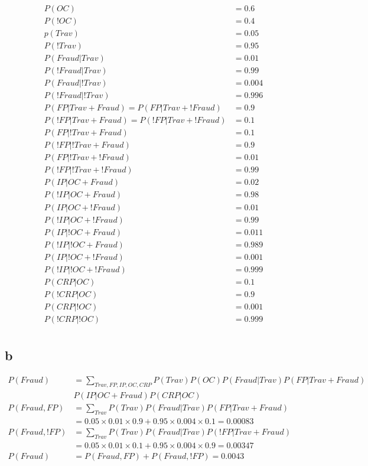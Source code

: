 \documentclass[11pt]{article}
\begin{document}
\begin{align*}
  P(OC) &= 0.6 \\
  P(!OC) &= 0.4 \\
  p(Trav) &= 0.05 \\
  P(!Trav) &= 0.95 \\
  P(Fraud | Trav) &= 0.01 \\
  P(!Fraud | Trav) &= 0.99 \\
  P(Fraud | !Trav) &= 0.004 \\
  P(!Fraud | !Trav) &= 0.996 \\
  P(FP | Trav + Fraud) = P(FP | Trav + !Fraud) &= 0.9 \\
  P(!FP | Trav + Fraud) = P(!FP | Trav + !Fraud) &= 0.1 \\
  P(FP | !Trav + Fraud) &= 0.1 \\
  P(!FP | !Trav + Fraud) &= 0.9 \\
  P(FP | !Trav + !Fraud) &= 0.01 \\
  P(!FP | !Trav + !Fraud) &= 0.99 \\
  P(IP | OC + Fraud) &= 0.02 \\
  P(!IP | OC + Fraud) &= 0.98 \\
  P(IP | OC + !Fraud) &= 0.01 \\
  P(!IP | OC + !Fraud) &= 0.99 \\
  P(IP | !OC + Fraud) &= 0.011 \\
  P(!IP | !OC + Fraud) &= 0.989 \\
  P(IP | !OC + !Fraud) &= 0.001 \\
  P(!IP | !OC + !Fraud) &= 0.999 \\
  P(CRP | OC) &= 0.1 \\
  P(!CRP | OC) &= 0.9 \\
  P(CRP | !OC) &= 0.001 \\
  P(!CRP | !OC) &= 0.999 \\
\end{align*}

\subsection{b}

\begin{align*}
  P(Fraud) &= \sum_{Trav, FP, IP, OC, CRP} P(Trav) P(OC) P(Fraud | Trav) P(FP | Trav + Fraud) \\ 
  &P(IP | OC + Fraud) P(CRP | OC) \\
  P(Fraud, FP) &= \sum_{Trav} P(Trav) P(Fraud | Trav) P(FP | Trav + Fraud) \\
  &= 0.05 \times 0.01 \times 0.9 + 0.95 \times 0.004 \times 0.1 = 0.00083\\
  P(Fraud, !FP) &= \sum_{Trav} P(Trav) P(Fraud | Trav) P(!FP | Trav + Fraud) \\
  &= 0.05 \times 0.01 \times 0.1 + 0.95 \times 0.004 \times 0.9 =0.00347\\
  P(Fraud) &= P(Fraud, FP) + P(Fraud, !FP) = 0.0043 \\
\end{align*}
\end{document}
